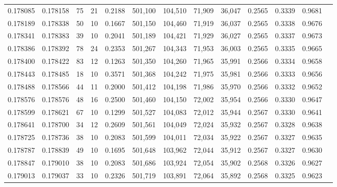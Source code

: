 \begin{tabular}{rrrrrrrrrrrrr}
0.178085 & 0.178158 &    75 &  21 &                                     0.2188 & 501,100 & 104,510 &  71,909 &  36,047 & 0.2565 & 0.3339 & 0.9681 \\
0.178189 & 0.178338 &    50 &  10 &                                     0.1667 & 501,150 & 104,460 &  71,919 &  36,037 & 0.2565 & 0.3338 & 0.9676 \\
0.178341 & 0.178383 &    39 &  10 &                                     0.2041 & 501,189 & 104,421 &  71,929 &  36,027 & 0.2565 & 0.3337 & 0.9673 \\
0.178386 & 0.178392 &    78 &  24 &                                     0.2353 & 501,267 & 104,343 &  71,953 &  36,003 & 0.2565 & 0.3335 & 0.9665 \\
0.178400 & 0.178422 &    83 &  12 &                                     0.1263 & 501,350 & 104,260 &  71,965 &  35,991 & 0.2566 & 0.3334 & 0.9658 \\
0.178443 & 0.178485 &    18 &  10 &                                     0.3571 & 501,368 & 104,242 &  71,975 &  35,981 & 0.2566 & 0.3333 & 0.9656 \\
0.178488 & 0.178566 &    44 &  11 &                                     0.2000 & 501,412 & 104,198 &  71,986 &  35,970 & 0.2566 & 0.3332 & 0.9652 \\
0.178576 & 0.178576 &    48 &  16 &                                     0.2500 & 501,460 & 104,150 &  72,002 &  35,954 & 0.2566 & 0.3330 & 0.9647 \\
0.178599 & 0.178621 &    67 &  10 &                                     0.1299 & 501,527 & 104,083 &  72,012 &  35,944 & 0.2567 & 0.3330 & 0.9641 \\
0.178641 & 0.178700 &    34 &  12 &                                     0.2609 & 501,561 & 104,049 &  72,024 &  35,932 & 0.2567 & 0.3328 & 0.9638 \\
0.178725 & 0.178736 &    38 &  10 &                                     0.2083 & 501,599 & 104,011 &  72,034 &  35,922 & 0.2567 & 0.3327 & 0.9635 \\
0.178787 & 0.178839 &    49 &  10 &                                     0.1695 & 501,648 & 103,962 &  72,044 &  35,912 & 0.2567 & 0.3327 & 0.9630 \\
0.178847 & 0.179010 &    38 &  10 &                                     0.2083 & 501,686 & 103,924 &  72,054 &  35,902 & 0.2568 & 0.3326 & 0.9627 \\
0.179013 & 0.179037 &    33 &  10 &                                     0.2326 & 501,719 & 103,891 &  72,064 &  35,892 & 0.2568 & 0.3325 & 0.9623 \\

\end{tabular}
